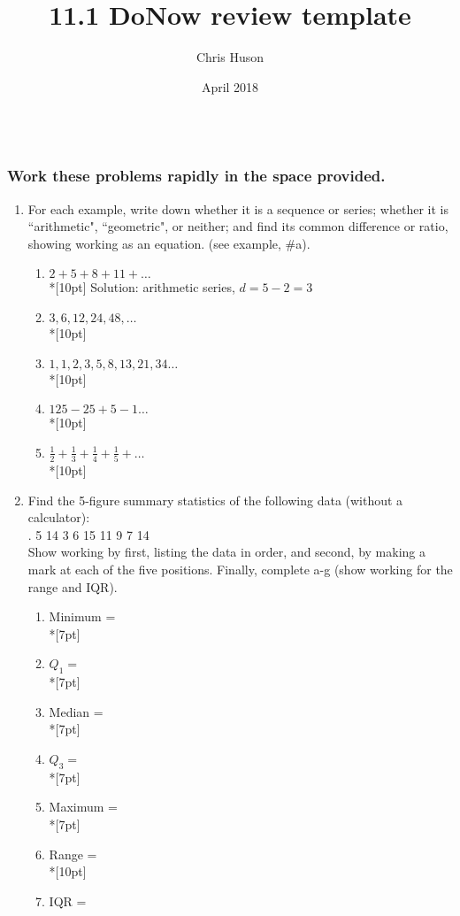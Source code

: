 \documentclass[12pt, oneside]{article}
\title{11.1 DoNow review template}
\author{Chris Huson}
\date{April 2018}
\begin{document}
\subsubsection*{\\ \textnormal{Work these problems rapidly in the space provided.}}

\begin{enumerate}
\item For each example, write down whether it is a sequence or series; whether it is ``arithmetic", ``geometric", or neither; and find its common difference or ratio, showing working as an equation. (see example, \#a).
\begin{enumerate}
    \item $2+5+8+11+\dots$\\*[10pt]
    Solution: arithmetic series, $d=5-2=3$
    \item $3, 6, 12, 24, 48, \dots$\\*[10pt]
    \item $1, 1, 2, 3, 5,8,13,21,34 \dots$\\*[10pt]
    \item $125-25+5-1 \dots$\\*[10pt]
    \item $\displaystyle \frac{1}{2}+\frac{1}{3}+\frac{1}{4}+\frac{1}{5}+ \dots$\\*[10pt]
\end{enumerate}


\item Find the 5-figure summary statistics of the following data (without a calculator):\\ .\hspace{4cm} 5 14 3 6 15 11 9 7 14\\
Show working by first, listing the data in order, and second, by making a mark at each of the five positions. Finally, complete a-g (show working for the range and IQR).
\begin{enumerate}
    \item Minimum = \\*[7pt]
    \item $Q_1 =$\\*[7pt]
    \item Median = \\*[7pt]
    \item $Q_3 =$\\*[7pt]
    \item Maximum = \\*[7pt]
    \item Range =\\*[10pt]
    \item IQR =
\end{enumerate}

\end{enumerate}
\end{document}

